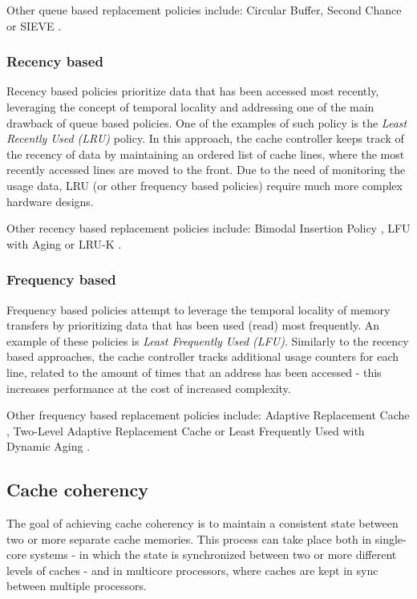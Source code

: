 \vspace{10px}\noindent Other queue based replacement policies include: Circular Buffer, Second Chance or SIEVE \cite{fifo2}.

\subsubsection{Recency based}
Recency based policies prioritize data that has been accessed most recently, leveraging the concept of temporal locality and addressing one of
the main drawback of queue based policies. One of the examples of such policy is the \textit{Least Recently Used (LRU)} policy. In this approach, the cache controller
keeps track of the recency of data by maintaining an ordered list of cache lines, where the most recently accessed lines are moved to the front. Due to the need of monitoring
the usage data, LRU (or other frequency based policies) require much more complex hardware designs. 

\vspace{10px}\noindent Other recency based replacement policies include: Bimodal Insertion Policy \cite{bip}, LFU with Aging or LRU-K \cite{eviction_summary}.

\subsubsection{Frequency based}
Frequency based policies attempt to leverage the temporal locality of memory transfers by prioritizing data that has been used (read) most frequently.
An example of these policies is \textit{Least Frequently Used (LFU)}. Similarly to the recency based approaches, the cache controller tracks additional usage counters
for each line, related to the amount of times that an address has been accessed - this increases performance at the cost of increased complexity.

\vspace{10px}\noindent Other frequency based replacement policies include: Adaptive Replacement Cache \cite{arc1}, Two-Level Adaptive Replacement Cache \cite{twoleveladaptive} or Least Frequently Used with Dynamic Aging \cite{jayarekha2010adaptive}. %
%
\subsection{Cache coherency}

The goal of achieving cache coherency is to maintain a consistent state between two or
more separate cache memories. This process can take place both in single-core
systems - in which the state is synchronized between two or more different levels of caches
- and in multicore processors, where caches are kept in sync between multiple
processors.

